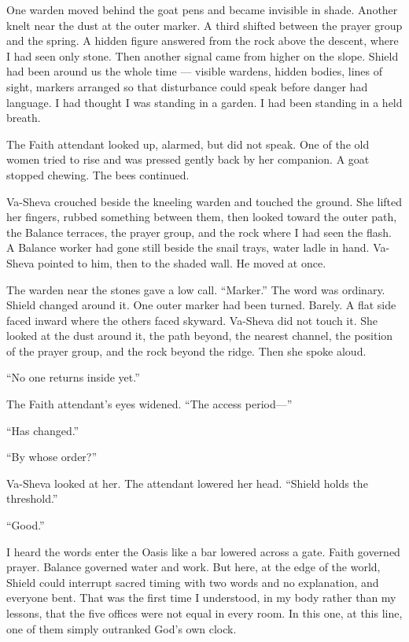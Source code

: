 One warden moved behind the goat pens and became invisible in shade. Another knelt near the dust at the outer marker. A third shifted between the prayer group and the spring. A hidden figure answered from the rock above the descent, where I had seen only stone. Then another signal came from higher on the slope. Shield had been around us the whole time --- visible wardens, hidden bodies, lines of sight, markers arranged so that disturbance could speak before danger had language. I had thought I was standing in a garden. I had been standing in a held breath.\par

The Faith attendant looked up, alarmed, but did not speak. One of the old women tried to rise and was pressed gently back by her companion. A goat stopped chewing. The bees continued.\par

Va-Sheva crouched beside the kneeling warden and touched the ground. She lifted her fingers, rubbed something between them, then looked toward the outer path, the Balance terraces, the prayer group, and the rock where I had seen the flash. A Balance worker had gone still beside the snail trays, water ladle in hand. Va-Sheva pointed to him, then to the shaded wall. He moved at once.\par

The warden near the stones gave a low call. ``Marker.'' The word was ordinary. Shield changed around it. One outer marker had been turned. Barely. A flat side faced inward where the others faced skyward. Va-Sheva did not touch it. She looked at the dust around it, the path beyond, the nearest channel, the position of the prayer group, and the rock beyond the ridge. Then she spoke aloud.\par

``No one returns inside yet.''\par

The Faith attendant's eyes widened. ``The access period---''\par

``Has changed.''\par

``By whose order?''\par

Va-Sheva looked at her. The attendant lowered her head. ``Shield holds the threshold.''\par

``Good.''\par

I heard the words enter the Oasis like a bar lowered across a gate. Faith governed prayer. Balance governed water and work. But here, at the edge of the world, Shield could interrupt sacred timing with two words and no explanation, and everyone bent. That was the first time I understood, in my body rather than my lessons, that the five offices were not equal in every room. In this one, at this line, one of them simply outranked God's own clock.\par

